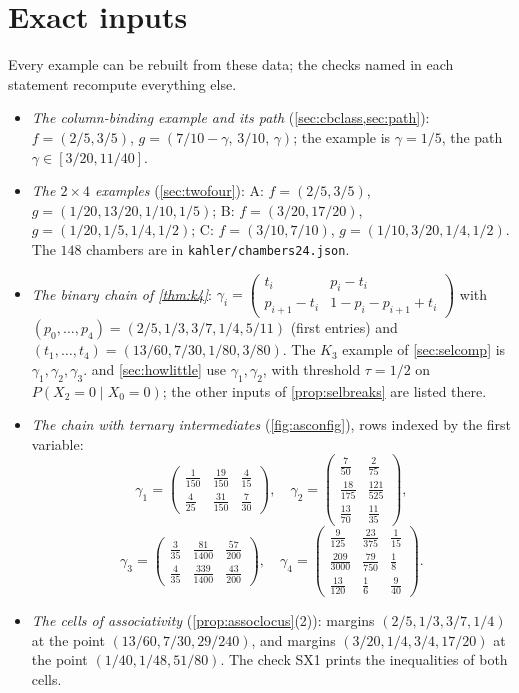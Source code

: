 \documentclass[11pt]{article}
\theoremstyle{definition}\newtheorem{definition}[theorem]{Definition}\newtheorem{remark}[theorem]{Remark}\newtheorem{example}[theorem]{Example}\newtheorem{problem}[theorem]{Open problem}\crefname{problem}{Problem}{Problems}
\begin{document}
\section{Exact inputs}\label{app:inputs}
Every example can be rebuilt from these data; the checks named in each statement recompute everything else.
\begin{itemize}
\item \emph{The column-binding example and its path} (\cref{sec:cbclass,sec:path}): $f=(2/5,3/5)$, $g=(7/10-\gamma,\,3/10,\,\gamma)$; the example is $\gamma=1/5$, the path $\gamma\in[3/20,11/40]$.
\item \emph{The $2\times4$ examples} (\cref{sec:twofour}): A: $f=(2/5,3/5)$, $g=(1/20,13/20,1/10,1/5)$; B: $f=(3/20,17/20)$, $g=(1/20,1/5,1/4,1/2)$; C: $f=(3/10,7/10)$, $g=(1/10,3/20,1/4,1/2)$. The $148$
chambers are in \texttt{kahler/chambers24.json}.
\item \emph{The binary chain of \cref{thm:k4}}: $\gamma_i=\left(\begin{smallmatrix}t_i&p_i-t_i\\ p_{i+1}-t_i&1-p_i-p_{i+1}+t_i\end{smallmatrix}\right)$ with $(p_0,\dots,p_4)=(2/5,1/3,3/7,1/4,5/11)$ (first entries) and
$(t_1,\dots,t_4)=(13/60,7/30,1/80,3/80)$. The $K_3$ example of \cref{sec:selcomp} is $\gamma_1,\gamma_2,\gamma_3$.  and \cref{sec:howlittle} use $\gamma_1,\gamma_2$, with threshold $\tau=1/2$ on $P(X_2=0\mid X_0=0)$; the other inputs of \cref{prop:selbreaks} are listed there.
\item \emph{The chain with ternary intermediates} (\cref{fig:asconfig}), rows indexed by the first variable:
\[
\gamma_1=\begin{pmatrix}\frac1{150}&\frac{19}{150}&\frac4{15}\\[1pt] \frac4{25}&\frac{31}{150}&\frac7{30}\end{pmatrix},\quad
\gamma_2=\begin{pmatrix}\frac7{50}&\frac2{75}\\[1pt] \frac{18}{175}&\frac{121}{525}\\[1pt] \frac{13}{70}&\frac{11}{35}\end{pmatrix},
\]
\[
\gamma_3=\begin{pmatrix}\frac3{35}&\frac{81}{1400}&\frac{57}{200}\\[1pt] \frac4{35}&\frac{339}{1400}&\frac{43}{200}\end{pmatrix},\quad
\gamma_4=\begin{pmatrix}\frac9{125}&\frac{23}{375}&\frac1{15}\\[1pt] \frac{209}{3000}&\frac{79}{750}&\frac18\\[1pt] \frac{13}{120}&\frac16&\frac9{40}\end{pmatrix}.
\]
\item \emph{The cells of associativity} (\cref{prop:assoclocus}(2)): margins $(2/5,1/3,3/7,1/4)$ at the point $(13/60,7/30,29/240)$, and margins $(3/20,1/4,3/4,17/20)$ at the point
$(1/40,1/48,51/80)$. The check SX1 prints the inequalities of both cells.
\end{itemize}
\end{document}
